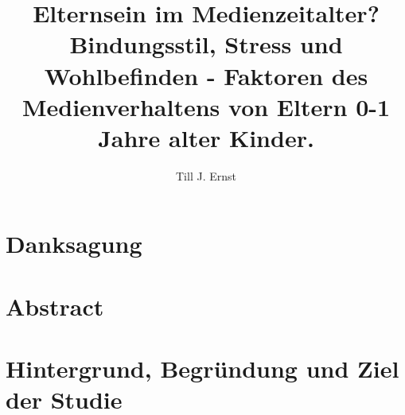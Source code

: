 


\title{Elternsein im Medienzeitalter? \\
Bindungsstil, Stress und Wohlbefinden - Faktoren des Medienverhaltens von Eltern 0-1 Jahre alter Kinder.}
\author{Till J. Ernst}



\makenoidxglossaries %




\section*{Danksagung}\label{sec:Danksagung}

\newpage

\section*{Abstract}\label{sec:Abstract}

\newpage

%




\setcounter{page}{1}
\tableofcontents
\newpage

\listoffigures
\newpage

\listoftables
\newpage

\printnoidxglossary[sort=word, title={Abkürzungsverzeichnis}]%
\newpage

\setcounter{page}{1}

\section{Hintergrund, Begründung und Ziel der Studie}\label{sec:Einleitung}


